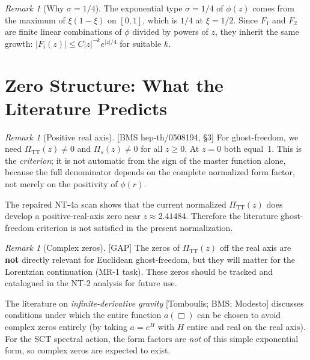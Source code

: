 \documentclass[12pt,a4paper]{article}
\theoremstyle{definition}
\theoremstyle{remark}
\newtheorem{remark}[proposition]{Remark}
\newcommand{\fromlit}[1]{\textcolor{blue!70!black}{\textsf{[#1]}}}
\newcommand{\gap}{\textcolor{red!80!black}{\textsf{[GAP]}}}
\begin{document}
\begin{remark}[Why $\sigma = 1/4$]
The exponential type $\sigma = 1/4$ of $\phi(z)$ comes from the
maximum of $\xi(1-\xi)$ on $[0,1]$, which is $1/4$ at $\xi = 1/2$.
Since $F_1$ and $F_2$ are finite linear combinations of $\phi$
divided by powers of $z$, they inherit the same growth:
$|F_i(z)| \leq C |z|^{-k} e^{|z|/4}$ for suitable $k$.
\end{remark}


\section{Zero Structure: What the Literature Predicts}
\label{sec:zeros}

\begin{remark}[Positive real axis]
\fromlit{BMS hep-th/0508194, \S3}
For ghost-freedom, we need $\Pi_{\text{TT}}(z) \neq 0$ and
$\Pi_s(z) \neq 0$ for all $z \geq 0$.  At $z = 0$ both equal~1.
This is the \emph{criterion}; it is not automatic from the sign of the
master function alone, because the full denominator depends on the
complete normalized form factor, not merely on the positivity of
$\phi(r)$.
\par\smallskip
The repaired NT-4a scan shows that the current normalized
$\Pi_{\text{TT}}(z)$ does develop a positive-real-axis zero near
$z \approx 2.41484$. Therefore the literature ghost-freedom criterion is
not satisfied in the present normalization.
\end{remark}

\begin{remark}[Complex zeros]
\gap\;
The zeros of $\Pi_{\text{TT}}(z)$ off the real axis are
\textbf{not} directly relevant for Euclidean ghost-freedom,
but they will matter for the Lorentzian continuation (MR-1 task).
These zeros should be tracked and catalogued in the NT-2 analysis
for future use.

\medskip
The literature on \emph{infinite-derivative gravity}
\fromlit{Tomboulis; BMS; Modesto} discusses conditions under which
the entire function $a(\Box)$ can be chosen to avoid complex zeros
entirely (by taking $a = e^{H}$ with $H$ entire and real on the
real axis).  For the SCT spectral action, the form factors are
\emph{not} of this simple exponential form, so complex zeros are
expected to exist.
\end{remark}
\end{document}
